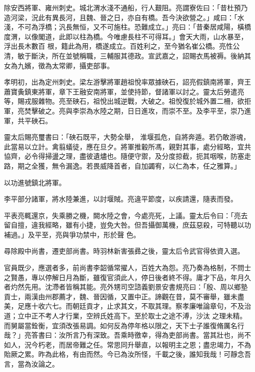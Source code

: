 \begin{pinyinscope}
 除安西將軍、雍州刺史。城北渭水淺不通船，行人艱阻。亮謂寮佐曰：「昔杜預乃造河梁，況此有異長河，且魏、晉之日，亦自有橋。吾今決欲營之。」咸曰：「水淺，不可為浮橋；汎長無恒，又不可施柱。恐難成立。」亮曰：「昔秦居咸陽，橫橋度渭，以像閣道，此即以柱為橋。今唯慮長柱不可得耳。」會天大雨，山水暴至，浮出長木數百
 根，籍此為用，橋遂成立。百姓利之，至今猶名崔公橋。亮性公清，敏于斷決，所在並號稱職，三輔服其德政。宣武嘉之，詔賜衣馬被褥。後納其女為九嬪，徵為太常卿，攝吏部事。



 孝明初，出為定州刺史。梁左游擊將軍趙祖悅率眾據硤石，詔亮假鎮南將軍，齊王蕭寶夤鎮東將軍，章下王融安南將軍，並使持節，督諸軍以討之。靈太后勞遣亮等，賜戎服雜物。亮至硤石，祖悅出城逆戰，大破之。祖悅復於城外置二柵，欲拒軍，亮焚擊破之。亮與李崇為水陸之期，日日進攻，而崇不至。及李平至，崇乃進軍，共平硤石。



 靈太后賜亮璽書曰：「硤石既平，大勢全舉，
 淮堰孤危，自將奔遁。若仍敢游魂，此當易以立計。禽翦蟻徒，應在旦夕。將軍推轂所馮，親對其事，處分經略，宜共協齊，必令得掃盪之理，盡彼遺燼也。隨便守禦，及分度掠截，扼其咽喉，防塞走路，期之全獲，無令漏逸。若畏威降首者，自加蠲宥，以仁為本，任之雅算。」



 以功進號鎮北將軍。



 李平部分諸軍，將水陸兼進，以討堰賊。亮違平節度，以疾請還，隨表而發。



 平表亮輒還京，失乘勝之機，闕水陸之會，今處亮死，上議。靈太后令曰：「亮去留自擅，違我經略，雖有小捷，豈免大咎。但吾攝御萬機，庶茲惡殺，可特聽以功補過。」及平至，亮與爭功禁中，形於聲
 色。



 尋除殿中尚書，遷吏部尚書。時羽林新害張彞之後，靈太后令武官得依資入選。



 官員既少，應選者多，前尚書李韶循常擢人，百姓大為怨。亮乃奏為格制，不問士之賢愚，專以停解日月為斷，雖復官須此人，停日後者終不得。庸才下品，年月久者灼然先用。沈滯者皆稱其能。亮外甥司空諮義劉景安書規亮曰：「殷、周以鄉塾貢士，兩漢由州郡薦才，魏、晉因循，又置中正。諦觀在昔，莫不審舉，雖未盡美，足應十收六七。而朝廷貢才，止求其文，不取其理。察孝廉唯論章句，不及治道；立中正不考人才行業，空辨氏姓高下。至於取士之途不溥，沙汰
 之理未精。而舅屬當銓衡，宜須改張易調。如何反為停年格以限之，天下士子誰復脩厲名行哉？」亮答書曰：汝所言乃有深致。吾乘時徼幸，得為吏部尚書。當其壯也，尚不如人，況今朽老，而居帝難之任。常思同升舉直，以報明主之恩；盡忠竭力，不為貽厥之累。昨為此格，有由而然。今已為汝所怪，千載之後，誰知我哉！可靜念吾言，當為汝論之。




\end{pinyinscope}
